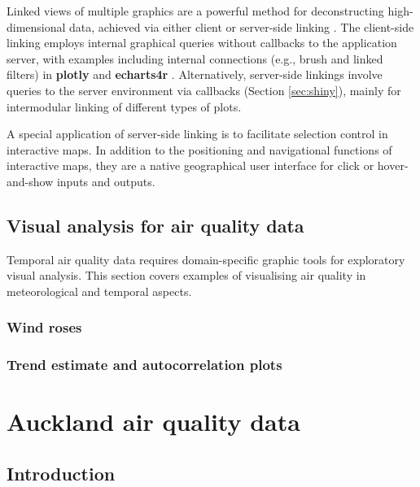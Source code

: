 \documentclass{aucklandthesis}
\begin{document}
Linked views of multiple graphics are a powerful method for deconstructing high-dimensional data, achieved via either client or server-side linking \autocite{plotly}. The client-side linking employs internal graphical queries without callbacks to the application server, with examples including internal connections (e.g., brush and linked filters) in \textbf{plotly} \autocite{plotly} and \textbf{echarts4r} \autocite{echarts4r}. Alternatively, server-side linkings involve queries to the server environment via callbacks (Section \ref{sec:shiny}), mainly for intermodular linking of different types of plots.

A special application of server-side linking is to facilitate selection control in interactive maps. In addition to the positioning and navigational functions of interactive maps, they are a native geographical user interface for click or hover-and-show inputs and outputs.

\hypertarget{visual-analysis-for-air-quality-data}{%
\section{Visual analysis for air quality data}\label{visual-analysis-for-air-quality-data}}

Temporal air quality data requires domain-specific graphic tools for exploratory visual analysis. This section covers examples of visualising air quality in meteorological and temporal aspects.

\hypertarget{wind-roses}{%
\subsection{Wind roses}\label{wind-roses}}

\hypertarget{trend-estimate-and-autocorrelation-plots}{%
\subsection{Trend estimate and autocorrelation plots}\label{trend-estimate-and-autocorrelation-plots}}

\hypertarget{ch:data}{%
\chapter{Auckland air quality data}\label{ch:data}}

\hypertarget{introduction}{%
\section{Introduction}\label{introduction}}
\end{document}
